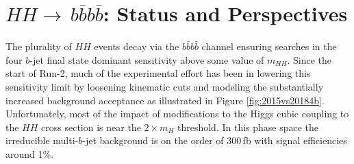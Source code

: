 
\newcommand*{\ifb}{fb$^{-1}$\xspace}
\newcommand*{\inbs}{nb$^{-1}$/s\xspace}
\newcommand*{\smhh}{SM $HH$\xspace}
\newcommand*{\bbbb}{\ensuremath{b\bar{b}b\bar{b}}\xspace}
\newcommand*{\bb}{\ensuremath{b\bar{b}}\xspace}
\newcommand*{\ttbar}{\ensuremath{t\bar{t}}\xspace}
\newcommand*{\hh}{\ensuremath{HH}\xspace}
\newcommand*{\bjet}{$b$-jet\xspace}
\newcommand*{\bjets}{$b$-jets\xspace}
\newcommand*{\btag}{$b$-tag\xspace}
\newcommand*{\btags}{$b$-tags\xspace}
\newcommand*{\btagging}{$b$-tagging\xspace}
\newcommand*{\btagged}{$b$-tagged\xspace}
\newcommand*{\mhh}{\ensuremath{m_{HH}}\xspace}
\newcommand*{\mh}{\ensuremath{m_{H}}\xspace}
\newcommand*{\pt}{\ensuremath{p_T}\xspace}

\section{$HH\to\,$\bbbb: Status and Perspectives}
\label{sec:HH4b}

The plurality of \hh events decay via the \bbbb channel ensuring searches in the four \bjet final state dominant sensitivity above some value of \mhh.
Since the start of Run-2, much of the experimental effort has been in lowering this sensitivity limit by loosening kinematic cuts
and modeling the substantially increased background acceptance as illustrated in Figure \ref{fig:2015vs20184b}.
Unfortunately, most of the impact of modifications to the Higgs cubic coupling to the \hh cross section is near the $2\times$\mh threshold.
In this phase space the irreducible multi-\bjet background is on the order of 300$\,$fb with signal efficiencies around 1\%.

